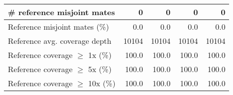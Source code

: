 \documentclass[12pt,a4paper]{article}
\begin{document}
\begin{table}[ht]
\begin{center}
\begin{tabular}{|l*{4}{|r}|}
\# reference misjoint mates & 0 & 0 & 0 & 0 \\ \hline
Reference misjoint mates (\%) & 0.0 & 0.0 & 0.0 & 0.0 \\ \hline
Reference avg. coverage depth & 10104 & 10104 & 10104 & 10104 \\ \hline
Reference coverage $\geq$ 1x (\%) & 100.0 & 100.0 & 100.0 & 100.0 \\ \hline
Reference coverage $\geq$ 5x (\%) & 100.0 & 100.0 & 100.0 & 100.0 \\ \hline
Reference coverage $\geq$ 10x (\%) & 100.0 & 100.0 & 100.0 & 100.0 \\ \hline
\end{tabular}
\end{center}
\end{table}
\end{document}
